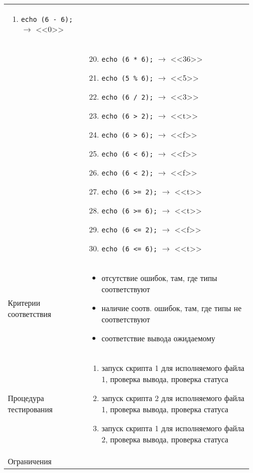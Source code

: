 \documentclass[a4paper, 12pt]{article}
\begin{document}
\begin{longtable}[H]{|l|p{4in}|}
\begin{enumerate}
			\item {\tt echo (6 - 6);} $\rightarrow$ <<0>>
		\end{enumerate}\\&
				\begin{enumerate}
						\setcounter{enumi}{19}
			\item {\tt echo (6 * 6);} $\rightarrow$ <<36>>
			\item {\tt echo (5 \% 6);} $\rightarrow$ <<5>>
			\item {\tt echo (6 / 2);} $\rightarrow$ <<3>>
			\item {\tt echo (6 > 2);} $\rightarrow$ <<t>>
			\item {\tt echo (6 > 6);} $\rightarrow$ <<f>>
			\item {\tt echo (6 < 6);} $\rightarrow$ <<f>>
			\item {\tt echo (6 < 2);} $\rightarrow$ <<f>>
			\item {\tt echo (6 >= 2);} $\rightarrow$ <<t>>
			\item {\tt echo (6 >= 6);} $\rightarrow$ <<t>>
			\item {\tt echo (6 <= 2);} $\rightarrow$ <<f>>
			\item {\tt echo (6 <= 6);} $\rightarrow$ <<t>>
		\end{enumerate}
		\\
		\hline
		Критерии соответствия	&
		\begin{itemize}
			\item отсутствие ошибок, там, где типы соответствуют
			\item наличие соотв. ошибок, там, где типы не соответствуют
			\item соответствие вывода ожидаемому
		\end{itemize}
		\\
		\hline
		Процедура тестирования	&
		\begin{enumerate}
			\item запуск скрипта 1 для исполняемого файла 1, проверка вывода, проверка статуса
			\item запуск скрипта 2 для исполняемого файла 1, проверка вывода, проверка статуса
			\item запуск скрипта 1 для исполняемого файла 2, проверка вывода, проверка статуса
		\end{enumerate}\\
		\hline
		Ограничения		&\\
		\hline
	\end{longtable}

\end{document}
